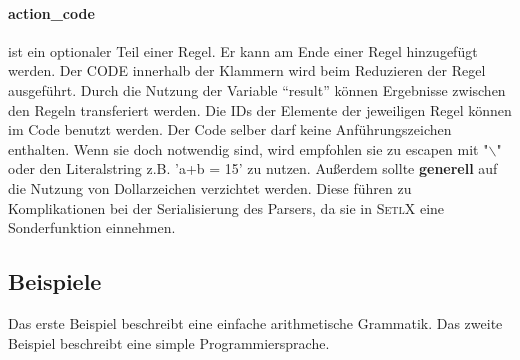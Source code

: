 \paragraph{action\_code} ist ein optionaler Teil einer Regel. Er kann am Ende einer Regel hinzugefügt werden. Der CODE innerhalb der Klammern  wird beim Reduzieren der Regel ausgeführt. Durch die Nutzung der Variable "`result"' können Ergebnisse zwischen den Regeln transferiert werden. Die IDs der Elemente der jeweiligen Regel können im Code benutzt werden. Der Code selber darf keine Anführungszeichen enthalten. Wenn sie doch notwendig sind, wird empfohlen sie zu escapen mit "$\backslash$" oder den Literalstring z.B. 'a+b = 15' zu nutzen. Außerdem sollte \textbf{generell} auf die Nutzung von Dollarzeichen verzichtet werden. Diese führen zu Komplikationen bei der Serialisierung des Parsers, da sie in \textsc{SetlX} eine Sonderfunktion einnehmen. 
\newpage
\subsection{Beispiele}
Das erste Beispiel beschreibt eine einfache arithmetische Grammatik.
Das zweite Beispiel beschreibt eine simple Programmiersprache.
